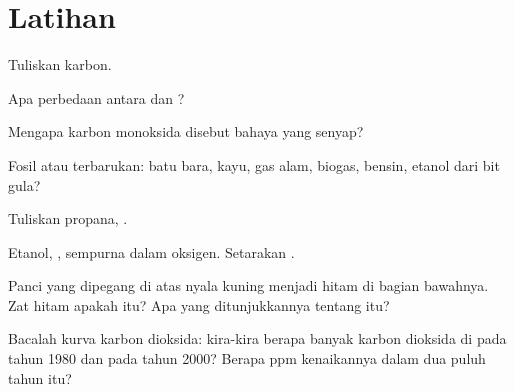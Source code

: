 \section{Latihan}

\begin{exercise}[$\star$]\label{exo:g8:combustion-and-fuels:1}
Tuliskan   karbon.
\end{exercise}

\begin{exercise}[$\star$]\label{exo:g8:combustion-and-fuels:2}
Apa perbedaan antara  dan ?
\end{exercise}

\begin{exercise}[$\star$]\label{exo:g8:combustion-and-fuels:3}
Mengapa karbon monoksida disebut bahaya yang senyap?
\end{exercise}

\begin{exercise}[$\star$]\label{exo:g8:combustion-and-fuels:4}
Fosil atau terbarukan: batu bara, kayu, gas alam, biogas, bensin, etanol
dari bit gula?
\end{exercise}

\begin{exercise}[$\star\star$]\label{exo:g8:combustion-and-fuels:5}
Tuliskan   propana, .
\end{exercise}

\begin{exercise}[$\star\star$]\label{exo:g8:combustion-and-fuels:6}
Etanol, ,  sempurna dalam oksigen. Setarakan
. %
\end{exercise}

\begin{exercise}[$\star\star$]\label{exo:g8:combustion-and-fuels:7}
Panci yang dipegang di atas nyala kuning menjadi hitam di bagian
bawahnya. Zat hitam apakah itu? Apa yang ditunjukkannya tentang
 itu?
\end{exercise}

\begin{exercise}[$\star\star$]\label{exo:g8:combustion-and-fuels:8}
Bacalah kurva karbon dioksida: kira-kira berapa banyak karbon dioksida
di  pada tahun 1980 dan pada tahun 2000? Berapa ppm kenaikannya
dalam dua puluh tahun itu?
\end{exercise}

